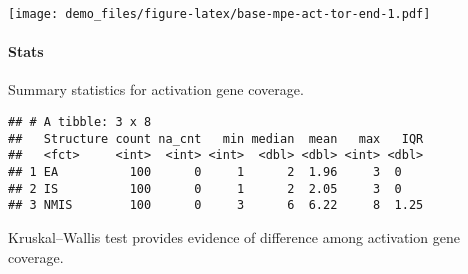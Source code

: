 \documentclass[]{book}
\newenvironment{Shaded}{\begin{snugshade}}{\end{snugshade}}
\newcommand{\CharTok}[1]{\textcolor[rgb]{0.31,0.60,0.02}{#1}}
\newcommand{\DataTypeTok}[1]{\textcolor[rgb]{0.13,0.29,0.53}{#1}}
\newcommand{\DecValTok}[1]{\textcolor[rgb]{0.00,0.00,0.81}{#1}}
\newcommand{\KeywordTok}[1]{\textcolor[rgb]{0.13,0.29,0.53}{\textbf{#1}}}
\newcommand{\NormalTok}[1]{#1}
\newcommand{\OperatorTok}[1]{\textcolor[rgb]{0.81,0.36,0.00}{\textbf{#1}}}
\newcommand{\OtherTok}[1]{\textcolor[rgb]{0.56,0.35,0.01}{#1}}
\newcommand{\StringTok}[1]{\textcolor[rgb]{0.31,0.60,0.02}{#1}}
\let\oldparagraph\paragraph
\renewcommand{\paragraph}[1]{\oldparagraph{#1}\mbox{}}
\begin{document}
\texttt{[image: demo\_files/figure-latex/base-mpe-act-tor-end-1.pdf]}

\hypertarget{stats-24}{%
\paragraph{Stats}\label{stats-24}}

Summary statistics for activation gene coverage.

\begin{Shaded}
\end{Shaded}

\begin{verbatim}
## # A tibble: 3 x 8
##   Structure count na_cnt   min median  mean   max   IQR
##   <fct>     <int>  <int> <int>  <dbl> <dbl> <int> <dbl>
## 1 EA          100      0     1      2  1.96     3  0   
## 2 IS          100      0     1      2  2.05     3  0   
## 3 NMIS        100      0     3      6  6.22     8  1.25
\end{verbatim}

Kruskal--Wallis test provides evidence of difference among activation gene coverage.
\end{document}
